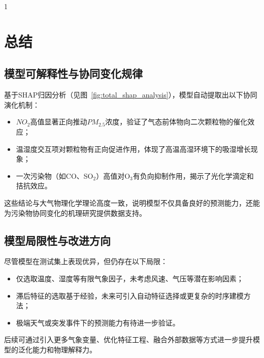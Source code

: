 \documentclass[a4paper, 12pt]{ctexart} %
\begin{document}
\begin{spacing}{1}
\bigskip
\section{总结}
\subsection{模型可解释性与协同变化规律}
基于SHAP归因分析（见图~\ref{fig:total_shap_analysis}），模型自动提取出以下协同演化机制：
\begin{itemize}
    \item $NO_2$高值显著正向推动$PM_{2.5}$浓度，验证了气态前体物向二次颗粒物的催化效应；
    \item 温湿度交互项对颗粒物有正向促进作用，体现了高温高湿环境下的吸湿增长现象；
    \item 一次污染物（如CO、SO$_2$）高值对O$_3$有负向抑制作用，揭示了光化学滴定和拮抗效应。
\end{itemize}
这些结论与大气物理化学理论高度一致，说明模型不仅具备良好的预测能力，还能为污染物协同变化的机理研究提供数据支持。

\subsection{模型局限性与改进方向}
尽管模型在测试集上表现优异，但仍存在以下局限：
\begin{itemize}
    \item 仅选取温度、湿度等有限气象因子，未考虑风速、气压等潜在影响因素；
    \item 滞后特征的选取基于经验，未来可引入自动特征选择或更复杂的时序建模方法；
    \item 极端天气或突发事件下的预测能力有待进一步验证。
\end{itemize}
后续可通过引入更多气象变量、优化特征工程、融合外部数据等方式进一步提升模型的泛化能力和物理解释力。

\end{spacing}

\end{document}
